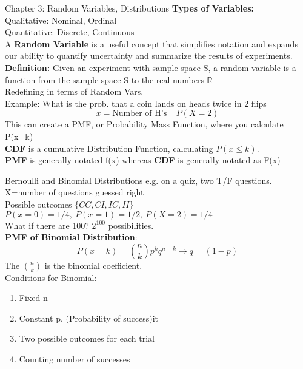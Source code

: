 \documentclass[a4paper, 12pt]{article}
\begin{document}
\begin{section}{Chapter 3: Random Variables, Distributions}
\textbf{Types of Variables:}\\
Qualitative: Nominal, Ordinal \\
Quantitative: Discrete, Continuous \\
A \textbf{Random Variable} is a useful concept that simplifies notation and expands our ability to quantify uncertainty and summarize the results of experiments.\\
\textbf{Definition:} Given an experiment with sample space S, a random variable is a function from the sample space S to the real numbers $\mathbb{R}$\\
Redefining in terms of Random Vars.\\
Example: What is the prob. that a coin lands on heads twice in 2 flips\\
\begin{equation} 
	x=\mbox{Number of H's}~~~~~ P(X=2)
\end{equation}
This can create a PMF, or Probability Mass Function, where you 
calculate P(x=k)\\
\textbf{CDF} is a cumulative Distribution Function, calculating
$P(x\leq k)$.\\
\textbf{PMF} is generally notated f(x) whereas \textbf{CDF} is
generally notated as F(x)\\
\begin{subsection}{Bernoulli and Binomial Distributions}
e.g. on a quiz, two T/F questions. X=number of questions guessed right\\
\indent Possible outcomes $\lbrace CC,CI,IC,II\rbrace$\\
\indent $P(x=0)=1/4,~P(x=1)=1/2,~P(X=2)=1/4$\\
\indent What if there are 100? $2^{100}$ possibilities.\\
\textbf{PMF of Binomial Distribution}:
\begin{equation} 
P(x=k)={n \choose k}p^{k}q^{n-k} \to q=(1-p)
\end{equation}
The ${n \choose k}$ is the binomial coefficient.\\
Conditions for Binomial:
\begin{enumerate}
\item{Fixed n}
\item{Constant p. (Probability of success)}it	
\item{Two possible outcomes for each trial}
\item{Counting number of successes}
\end{enumerate}

\end{subsection}
\end{section}
\end{document}
